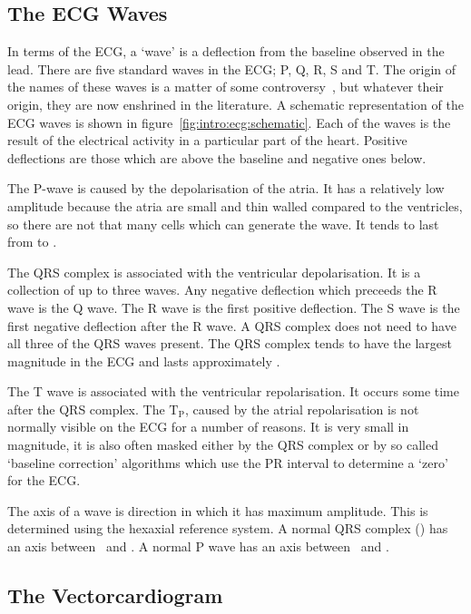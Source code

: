 \subsection{The ECG Waves}

In terms of the ECG, a `wave' is a deflection from the baseline observed in the
lead.
There are five standard waves in the ECG; P, Q, R, S and T.
The origin of the names of these waves is a matter of some
controversy~\cite{Hurst1998}, but whatever their origin, they are now enshrined
in the literature.
A schematic representation of the ECG waves is shown in
figure~\ref{fig:intro:ecg:schematic}.
Each of the waves is the result of the electrical activity in a particular part
of the heart.
Positive deflections are those which are above the baseline and negative ones
below.

The P-wave is caused by the depolarisation of the atria.
It has a relatively low amplitude because the atria are small and thin walled
compared to the ventricles, so there are not that many cells which can generate
the wave.
It tends to last from  to .

The QRS complex is associated with the ventricular depolarisation.
It is a collection of up to three waves.
Any negative deflection which preceeds the R wave is the Q wave.
The R wave is the first positive deflection.
The S wave is the first negative deflection after the R wave.
A QRS complex does not need to have all three of the QRS waves present.
The QRS complex tends to have the largest magnitude in the ECG and lasts
approximately .

The T wave is associated with the ventricular repolarisation.
It occurs some time after the QRS complex.
The $\text{T}_{\text{P}}$, caused by the atrial repolarisation is not normally
visible on the ECG for a number of reasons.
It is very small in magnitude, it is also often masked either by the QRS complex
or by so called `baseline correction' algorithms which use the PR interval to
determine a `zero' for the ECG.

The axis of a wave is direction in which it has maximum amplitude.
This is determined using the hexaxial reference system.
A normal QRS complex (\cite{Lipman1994,Katz2006}) has an axis between \
and .
A normal P wave has an axis between \ and .


\subsection{The Vectorcardiogram}

